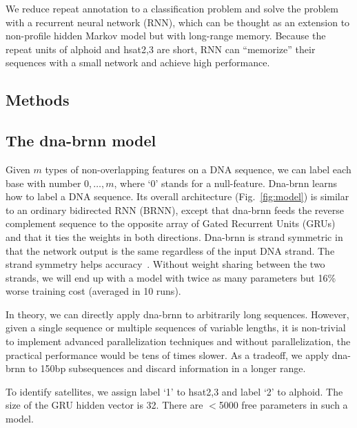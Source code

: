 \documentclass{bioinfo}
\begin{document}
We reduce repeat annotation to a classification problem and solve the problem
with a recurrent neural network (RNN), which can be thought as an extension to
non-profile hidden Markov model but with long-range memory. Because the repeat
units of alphoid and hsat2,3 are short, RNN can ``memorize'' their sequences with a
small network and achieve high performance.

\begin{methods}
\section{Methods}

\subsection{The dna-brnn model}

Given $m$ types of non-overlapping features on a DNA sequence, we can label
each base with number $0,\ldots,m$, where `0' stands for a null-feature.
\mbox{Dna-brnn} learns how to label a DNA sequence. Its overall architecture
(Fig.~\ref{fig:model}) is similar to an ordinary bidirected RNN
(BRNN), except that \mbox{dna-brnn} feeds the reverse complement sequence to the
opposite array of Gated Recurrent Units (GRUs) and that it ties the weights in both directions. Dna-brnn is
strand symmetric in that the network output is the same regardless of the input
DNA strand. The strand symmetry helps accuracy~\citep{Shrikumar103663}.
Without weight sharing between the two strands, we will end up with a model
with twice as many parameters but 16\% worse training cost (averaged in 10
runs).

In theory, we can directly apply dna-brnn to arbitrarily long sequences.
However, given a single sequence or multiple sequences of variable lengths, it
is non-trivial to implement advanced parallelization techniques and without
parallelization, the practical performance would be tens of times slower. As a
tradeoff, we apply dna-brnn to 150bp subsequences and discard information in a
longer range.

To identify satellites, we assign label `1' to hsat2,3 and label `2' to
alphoid. The size of the GRU hidden vector is 32. There are $<$5000 free
parameters in such a model.


\end{methods}
\end{document}
